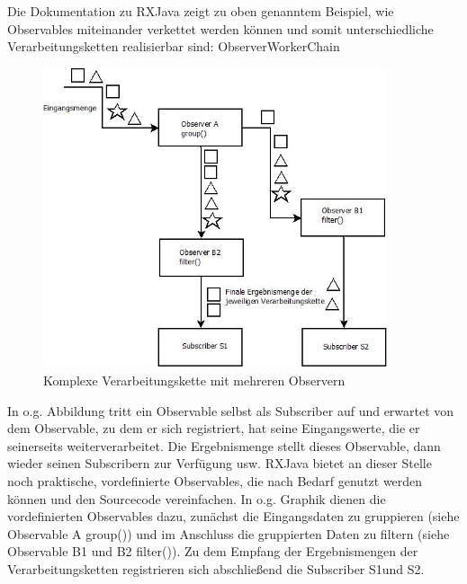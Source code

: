 \documentclass[12pt,oneside,a4paper,bibtotoc,liststotoc]{scrreprt}
\begin{document}
Die Dokumentation zu RXJava zeigt zu oben genanntem Beispiel, wie Observables miteinander verkettet werden können und somit unterschiedliche Verarbeitungsketten realisierbar sind:
ObserverWorkerChain
\begin{figure}[H]
  \begin{centering}
    \includegraphics[width=0.9\textwidth]{img/ObserverWorkerChain.jpeg}
    \caption{Komplexe Verarbeitungskette mit mehreren Observern}
    \label{ObserverWorkerChain}
  \end{centering}
\end{figure}
In o.g. Abbildung tritt ein Observable selbst als Subscriber auf und erwartet von dem Observable, zu dem er sich registriert, hat seine Eingangswerte, die er seinerseits weiterverarbeitet. Die Ergebnismenge stellt dieses Observable, dann wieder seinen Subscribern zur Verfügung usw. RXJava bietet an dieser Stelle noch praktische, vordefinierte Observables, die nach Bedarf genutzt werden können und den Sourcecode vereinfachen. In o.g. Graphik dienen die vordefinierten Observables dazu, zunächst die Eingangsdaten zu gruppieren (siehe Observable A group()) und im Anschluss die gruppierten Daten zu filtern (siehe Observable B1 und B2 filter()). Zu dem Empfang der Ergebnismengen der Verarbeitungsketten registrieren sich abschließend die Subscriber S1und S2.
\end{document}
